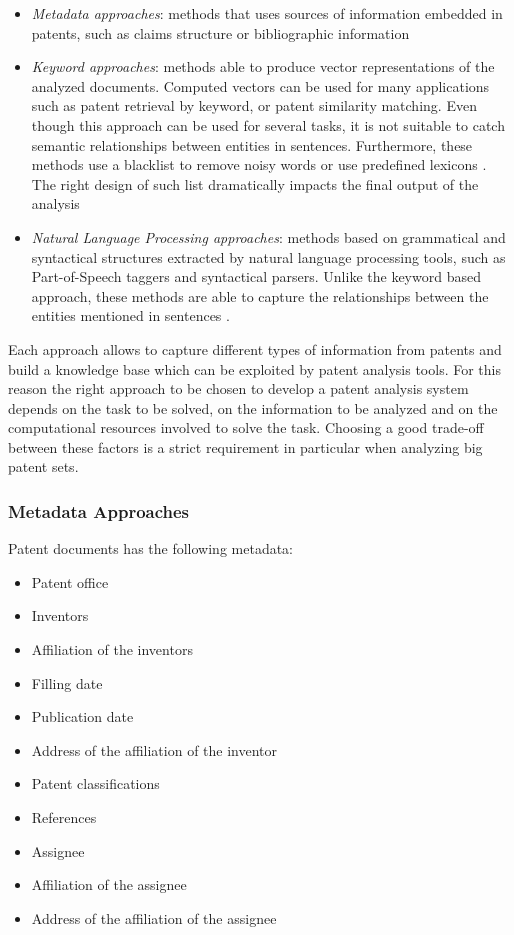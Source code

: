 \documentclass[]{book}
\providecommand{\tightlist}{%
  \setlength{\itemsep}{0pt}\setlength{\parskip}{0pt}}
\begin{document}
\begin{itemize}
\item
  \emph{Metadata approaches}: methods that uses sources of information
  embedded in patents, such as claims structure or bibliographic
  information
\item
  \emph{Keyword approaches}: methods able to produce vector
  representations of the analyzed documents. Computed vectors can be
  used for many applications such as patent retrieval by keyword, or
  patent similarity matching. Even though this approach can be used for
  several tasks, it is not suitable to catch semantic relationships
  between entities in sentences. Furthermore, these methods use a
  blacklist to remove noisy words \citep{blanchard2007understanding} or
  use predefined lexicons \citep{chiarello2017product}. The right design
  of such list dramatically impacts the final output of the analysis
  \citep[\citet{Lee2015}, \citet{Montecchi2013}]{Lee2009}
\item
  \emph{Natural Language Processing approaches}: methods based on
  grammatical and syntactical structures extracted by natural language
  processing tools, such as Part-of-Speech taggers and syntactical
  parsers. Unlike the keyword based approach, these methods are able to
  capture the relationships between the entities mentioned in sentences
  \citep[\citet{Park2011a}, \citet{Park20133}]{Park20131}.
\end{itemize}

Each approach allows to capture different types of information from
patents and build a knowledge base which can be exploited by patent
analysis tools. For this reason the right approach to be chosen to
develop a patent analysis system depends on the task to be solved, on
the information to be analyzed and on the computational resources
involved to solve the task. Choosing a good trade-off between these
factors is a strict requirement in particular when analyzing big patent
sets.

\subsubsection{Metadata Approaches}\label{metadata-approaches}

Patent documents has the following metadata:

\begin{itemize}
\tightlist
\item
  Patent office
\item
  Inventors
\item
  Affiliation of the inventors
\item
  Filling date
\item
  Publication date
\item
  Address of the affiliation of the inventor
\item
  Patent classifications
\item
  References
\item
  Assignee
\item
  Affiliation of the assignee
\item
  Address of the affiliation of the assignee
\end{itemize}
\end{document}
